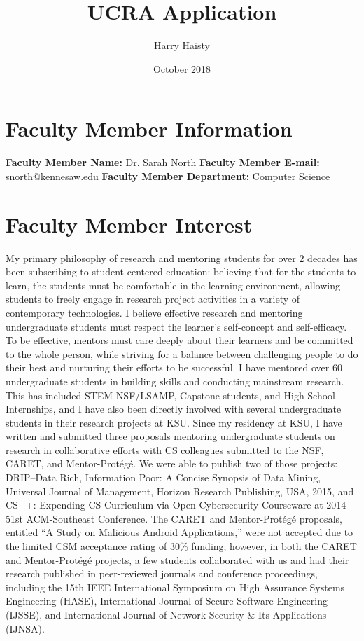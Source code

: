 \documentclass{article}
\title{UCRA Application}
\author{Harry Haisty}
\date{October 2018}
\begin{document}
\section*{Faculty Member Information}

\textbf{Faculty Member Name:} Dr. Sarah North \newline
\textbf{Faculty Member E-mail:} snorth@kennesaw.edu \newline
\textbf{Faculty Member Department:} Computer Science 

\section*{Faculty Member Interest} 
My primary philosophy of research and mentoring students for over 2 decades has been subscribing to student-centered education: believing that for the students to learn, the students must be comfortable in the learning environment, allowing students to freely engage in research project activities in a variety of contemporary technologies.  I believe effective research and mentoring undergraduate students must respect the learner’s self-concept and self-efficacy.  To be effective, mentors must care deeply about their learners and be committed to the whole person, while striving for a balance between challenging people to do their best and nurturing their efforts to be successful.
\newline \newline
I have mentored over 60 undergraduate students in building skills and conducting mainstream research. This has included STEM NSF/LSAMP, Capstone students, and High School Internships, and I have also been directly involved with several undergraduate students in their research projects at KSU. Since my residency at KSU, I have written and submitted three proposals mentoring undergraduate students on research in collaborative efforts with CS colleagues submitted to the NSF, CARET, and Mentor-Protégé.  
\newline\newline
We were able to publish two of those projects: DRIP–Data Rich, Information Poor: A Concise Synopsis of Data Mining, Universal Journal of Management, Horizon Research Publishing, USA, 2015, and CS++: Expending CS Curriculum via Open Cybersecurity Courseware at 2014 51st ACM-Southeast Conference. The CARET and Mentor-Protégé proposals, entitled “A Study on Malicious Android Applications,” were not accepted due to the limited CSM acceptance rating of 30\% funding; however, in both the CARET and Mentor-Protégé projects, a few students collaborated with us and had their research published in peer-reviewed journals and conference proceedings, including the 15th IEEE International Symposium on High Assurance Systems Engineering (HASE), International Journal of Secure Software Engineering (IJSSE), and International Journal of Network Security & Its Applications (IJNSA). 
\end{document}
